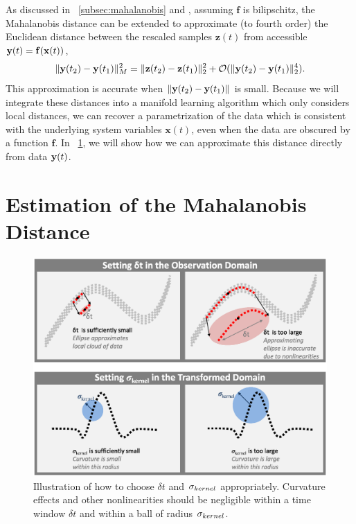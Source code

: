 %
As discussed in \sec~\ref{subsec:mahalanobis} and \cite{singer2008non}, assuming $\mathbf{f}$ is bilipschitz, the Mahalanobis distance can be extended to approximate (to fourth order) the Euclidean distance between the rescaled samples $\mathbf{z}(t)$ from accessible $\mathbf{y}(t) = \mathbf{f} (\mathbf{x}(t))$,
%
\begin{equation} \label{eq:mahalanobis2}
\| \mathbf{y}(t_2) - \mathbf{y}(t_1) \|^2_M = \| \mathbf{z}(t_2) - \mathbf{z}(t_1) \|^2_2 + \mathcal{O}(\| \mathbf{y}(t_2) - \mathbf{y}(t_1) \|^4_2).
\end{equation}
%
This approximation is accurate when $\| \mathbf{y}(t_2) - \mathbf{y}(t_1) \|$ is small.
%
Because we will integrate these distances into a manifold learning algorithm which only considers local distances, we can recover a parametrization of the data which is consistent with the underlying system variables $\mathbf{x}(t)$, even when the data are obscured by a function $\mathbf{f}$.
%
In \sec~\ref{sec:analysis}, we will show how we can approximate this distance directly from data $\mathbf{y}(t)$.

\section{Estimation of the Mahalanobis Distance} \label{sec:analysis}

\begin{figure}[t]
\centering
\includegraphics[width=\textwidth]{schematic}
\caption[Schematic of analysis parameters for multiscale data]{Illustration of how to choose $\delta t$ and $\sigma_{kernel}$ appropriately. 	Curvature effects and other nonlinearities should be negligible within a time window $\delta t$ and within a ball of radius $\sigma_{kernel}$.}
\label{fig:schematic}
\end{figure}


